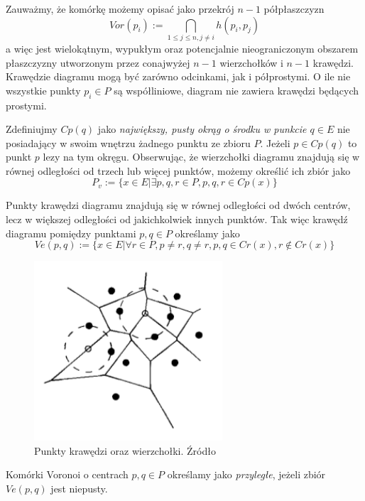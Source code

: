 \documentclass[skorowidz,autorrok,backref,xodstep,oswiadczenie]{wmimgr}
\begin{document}
Zauważmy, że komórkę możemy opisać jako przekrój $n-1$ półpłaszczyzn
\begin{equation}
Vor(p_{i}) := \bigcap_{1 \leq j \leq n, j \neq i} h(p_{i},p_{j})
\end{equation}
a więc jest wielokątnym, wypukłym oraz potencjalnie nieograniczonym obszarem płaszczyzny utworzonym przez conajwyżej $n-1$ wierzchołków i $n-1$ krawędzi. Krawędzie diagramu mogą być zarówno odcinkami, jak i półprostymi. O ile nie wszystkie punkty $p_{i} \in P$ są współliniowe, diagram nie zawiera krawędzi będących prostymi.

Zdefiniujmy $Cp(q)$ jako \emph{największy, pusty okrąg o środku w punkcie $q \in E$} nie posiadający w swoim wnętrzu żadnego punktu ze zbioru $P$. Jeżeli $p \in Cp(q)$ to punkt $p$ lezy na tym okręgu.
Obserwując, że wierzchołki diagramu znajdują się w równej odległości od trzech lub więcej punktów, możemy określić ich zbiór jako
\begin{equation}
P_{v} := \{ x \in E | \exists p,q,r \in P, p,q,r \in Cp(x) \}
\end{equation}

Punkty krawędzi diagramu znajdują się w równej odległości od dwóch centrów, lecz w większej odległości od jakichkolwiek innych punktów. Tak więc krawędź diagramu pomiędzy punktami $p,q \in P$ określamy jako
\begin{equation}
Ve(p,q) := \{ x \in E | \forall r \in P, p \neq r, q \neq r, p,q \in Cr(x), r \notin Cr(x) \}
\end{equation}

\begin{figure}[ht!]
\centering
\includegraphics[width=70mm]{images/voronoi2.png}
\caption{Punkty krawędzi oraz wierzchołki. Źródło \cite{geometria}}
\label{voronoicircles}
\end{figure}

Komórki Voronoi o centrach $p,q \in P$ określamy jako \emph{przyległe}, jeżeli zbiór $Ve(p,q)$ jest niepusty.
\end{document}
